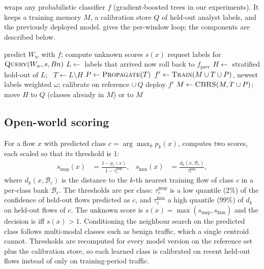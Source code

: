 \section{\nova{}}
\label{sec:method}

\nova{} wraps any probabilistic classifier $f$ (gradient-boosted trees in our experiments). It keeps a training
memory $M$, a calibration store $Q$ of held-out analyst labels, and the previously deployed model.
 gives the per-window loop; the components are described below.

\begin{algorithm}[t]
\caption{\nova{}, one window $W_w$}
\label{alg:nova}
\begin{algorithmic}[1]
\State predict $W_w$ with $f$; compute unknown scores $s(x)$ 
\State request labels for $\textsc{Query}(W_w, s, B n)$ 
\State $L \gets$ labels that arrived now
   \State roll back to $f_{\text{prev}}$ 
\EndIf
\State $H \gets$ stratified hold-out of $L$; \ $T \gets L\setminus H$
\State $P \gets \textsc{Propagate}(T)$ 
\State $f' \gets \textsc{Train}(M \cup T \cup P)$, newest labels weighted $\omega$; calibrate on reference $\cup\, Q$
   \State deploy $f'$
\EndIf
\State $M \gets \textsc{CBRS}(M, T \cup P)$; move $H$ to $Q$ (classes already in $M$) or to $M$
\end{algorithmic}
\end{algorithm}

\subsection{Open-world scoring}
\label{sec:unknown}
For a flow $x$ with predicted class $c = \arg\max_k p_k(x)$, \nova{} computes two scores, each scaled so that its
threshold is 1:
\begin{align}
s_{\text{msp}}(x) &= \frac{1 - p_c(x)}{1 - \tau^{\text{msp}}_c}, &
s_{\text{knn}}(x) &= \frac{d_k\!\left(x, \mathcal{B}_c\right)}{\tau^{\text{knn}}_c},
\end{align}
where $d_k(x,\mathcal{B}_c)$ is the distance to the $k$-th nearest training flow of class $c$ in a per-class bank
$\mathcal{B}_c$. The thresholds are per class: $\tau^{\text{msp}}_c$ is a low quantile (2\%) of the confidence of
held-out flows predicted as $c$, and $\tau^{\text{knn}}_c$ a high quantile (99\%) of $d_k$ on held-out flows of $c$.
The unknown score is $s(x) = \max(s_{\text{msp}}, s_{\text{knn}})$ and the decision is \unk{} iff $s(x) > 1$.
Conditioning the neighbour search on the predicted class follows multi-modal classes such as benign traffic, which
a single centroid~\cite{yang2021cade} cannot. Thresholds are recomputed for every model version on the reference set
plus the calibration store, so each learned class is calibrated on recent held-out flows instead of only on
training-period traffic.

